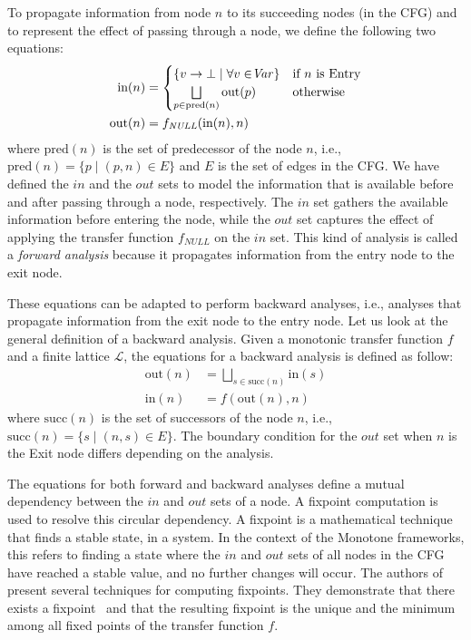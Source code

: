 To propagate information from node $n$ to its succeeding nodes (in the CFG) and to represent the
effect of passing through a node, we define the following two equations:
\begin{align*}
  \text{in}(n) &= \begin{cases} \{ v \rightarrow \bot \mid \forall v \in $\textit{Var}$ \} & $if $ n $ is Entry$ \\ \bigsqcup\limits_{p \in \text{pred}(n)} \text{out}(p) & $otherwise$ \end{cases} \\
  \text{out}(n) &= f_{\text{\textit{NULL}}}(\text{in}(n),n)
\end{align*}
where $\text{pred}(n)$ is the set of predecessor of the node $n$, i.e., $\text{pred}(n) = \{ p \mid (p,n)\in E\}$ and $E$ is the set of edges in the CFG.
We have defined the $in$ and the $out$ sets to model the information that is available
before and after passing through a node, respectively. The $in$ set gathers the available
information before entering the node, while the $out$ set captures the effect
of applying the transfer function $f_{\textit{NULL}}$ on the $in$ set.
This kind of analysis is called a \emph{forward analysis} because it propagates information
from the entry node to the exit node.

These equations can be adapted to perform backward analyses, i.e., analyses that
propagate information from the exit node to the entry node. Let us look at the
general definition of a backward analysis.
Given a monotonic transfer function $f$ and a finite lattice $\mathcal{L}$, the equations for
a backward analysis is defined as follow:
\begin{align*}
  \text{out}(n) &= \bigsqcup\limits_{s \in \text{succ}(n)} \text{in}(s) \\
  \text{in}(n) &= f(\text{out}(n),n)
\end{align*}
where $\text{succ}(n)$ is the set of successors of the node $n$, i.e., $\text{succ}(n) = \{ s \mid (n,s)\in E\}$.
The boundary condition for the $\textit{out}$ set when $n$ is the Exit node differs depending on the
analysis.

The equations for both forward and backward analyses define a mutual dependency
between the $in$ and $out$ sets of a node.
A fixpoint computation is used to resolve this circular dependency. A fixpoint is
a mathematical technique that finds a stable state, in a system.
In the context of the Monotone frameworks, this
refers to finding a state where the $in$ and $out$ sets of all nodes in the CFG have reached a
stable value, and no further changes will occur. The authors of~\cite{Nielson2010Principles}
present several techniques for computing fixpoints. They demonstrate that there exists a fixpoint~\cite{Knaster1929} and that the resulting
fixpoint is the unique and the minimum among all fixed points of the transfer function $f$.





